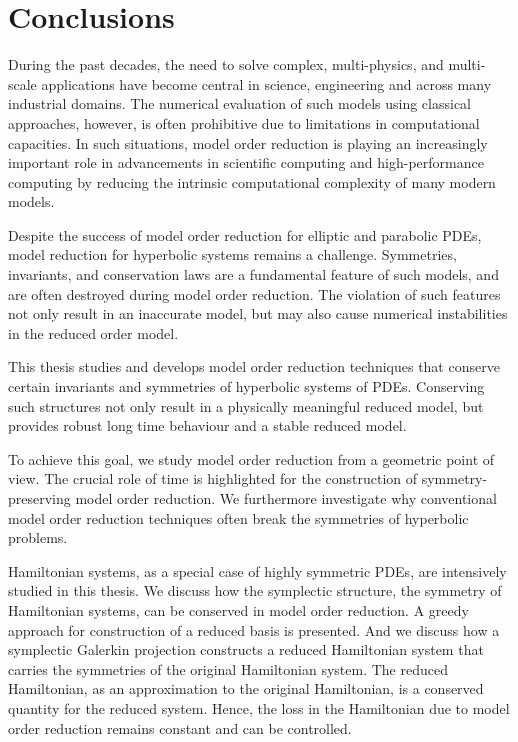 \chapter{Conclusions} \label{chapter:8}

During the past decades, the need to solve complex, multi-physics, and multi-scale applications have become central in science, engineering and across many industrial domains. The numerical evaluation of such models using classical approaches, however, is often prohibitive due to limitations in computational capacities. In such situations, model order reduction is playing an increasingly important role in advancements in scientific computing and high-performance computing by reducing the intrinsic computational complexity of many modern models.

Despite the success of model order reduction for elliptic and parabolic PDEs, model reduction for hyperbolic systems remains a challenge. Symmetries, invariants, and conservation laws are a fundamental feature of such models, and are often destroyed during model order reduction. The violation of such features not only result in an inaccurate model, but may also cause numerical instabilities in the reduced order model.

This thesis studies and develops model order reduction techniques that conserve certain invariants and symmetries of hyperbolic systems of PDEs. Conserving such structures not only result in a physically meaningful reduced model, but provides robust long time behaviour and a stable reduced model.

To achieve this goal, we study model order reduction from a geometric point of view. The crucial role of time is highlighted for the construction of symmetry-preserving model order reduction. We furthermore investigate why conventional model order reduction techniques often break the symmetries of hyperbolic problems.

Hamiltonian systems, as a special case of highly symmetric PDEs, are intensively studied in this thesis. We discuss how the symplectic structure, the symmetry of Hamiltonian systems, can be conserved in model order reduction. A greedy approach for construction of a reduced basis is presented. And we discuss how a symplectic Galerkin projection constructs a reduced Hamiltonian system that carries the symmetries of the original Hamiltonian system. The reduced Hamiltonian, as an approximation to the original Hamiltonian, is a conserved quantity for the reduced system. Hence, the loss in the Hamiltonian due to model order reduction remains constant and can be controlled.

